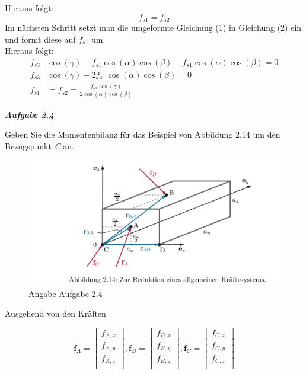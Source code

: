 \documentclass[a4paper,12p]{article}
\begin{document}
Hieraus folgt:
\begin{equation*}
	f_{s1} = f_{s2}
\end{equation*}
Im nächsten Schritt setzt man die umgeformte Gleichung (1) in Gleichung (2) ein und formt diese auf $ f_{s1} $ um. \\
Hieraus folgt:
\begin{align*}
	f_{s3}&\cos(\gamma) - f_{s1}\cos(\alpha)\cos(\beta) - f_{s1}\cos(\alpha)\cos(\beta) = 0 \\
	f_{s3}&\cos(\gamma) - 2f_{s1}\cos(\alpha)\cos(\beta) = 0 \\
	f_{s1}&=f_{s2} = \frac{f_{s3}\cos(\gamma)}{2\cos(\alpha)\cos(\beta)}
\end{align*}

\begin{flushleft}
    \textbf{\textit{\underline{Aufgabe 2.4}}}
\end{flushleft}
Geben Sie die Momentenbilanz für das Beispiel von Abbildung 2.14 um den Bezugspunkt \textit{C} an.  \newline
\begin{figure}[h]
    \includegraphics[width=12.5cm]{pic/Angabe2_4}
    \caption{Angabe Aufgabe 2.4}
    \label{Angabe 2.4}
\end{figure}
\begin{flushleft}
Ausgehend von den Kräften
\end{flushleft}
\begin{equation*}
	\textbf{f}_{A} = \left[\begin{array}{c}	f_{A,x} \\	f_{A,y} \\	f_{A,z} \\\end{array}\right] , 
	\textbf{f}_{B} = \left[\begin{array}{c}	f_{B,x} \\	f_{B,y} \\	f_{B,z} \\\end{array}\right] ,
	\textbf{f}_{C} = \left[\begin{array}{c}	f_{C,x} \\	f_{C,y} \\	f_{C,z} \\\end{array}\right]
\end{equation*}
\end{document}
